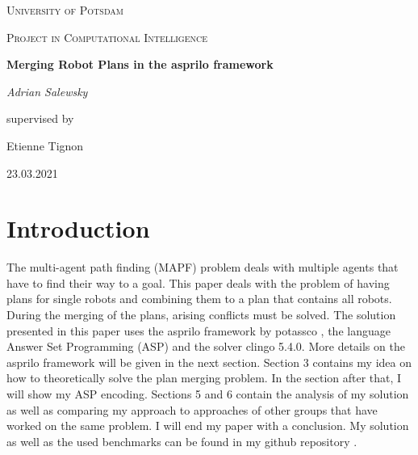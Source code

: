 \documentclass[runningheads]{llncs}
\begin{document}
\begin{titlepage}
\centering
{\scshape\LARGE University of Potsdam \par}
\vspace{1cm}
{\scshape\Large Project in Computational Intelligence\par}
\vspace{1.5cm}
{\huge\bfseries Merging Robot Plans in the asprilo framework\par}
\vspace{2cm}
{\Large\itshape Adrian Salewsky\par}
\vfill
supervised by\par
Etienne Tignon
\vfill
{23.03.2021 \par}


\begin{abstract}
This paper shows my approach to solving the plan merging problem in multi-agent path finding. This means that plans for single robots are combined to a plan for all robots. During the merging, all arising conflicts must be dealt with. This was done for a project
at the University of Potsdam in the course Computational Intelligence for the chair Computational Intelligence. The project was done in the asprilo framework with the programming language Answer Set Programming. 
\end{abstract}
\end{titlepage}


\section{Introduction}
The multi-agent path finding (MAPF) problem deals with multiple agents that have to find their way to a goal. This paper deals with the problem of having plans for single robots and combining them to a plan that contains all robots. During the merging of the plans, arising conflicts must be solved. The solution presented in this paper uses the asprilo framework by potassco \cite{asprilo}, the language Answer Set Programming (ASP) and the solver clingo 5.4.0. More details on the asprilo framework will be given in the next section. Section 3 contains my idea on how to theoretically solve the plan merging problem. In the section after that, I will show my ASP encoding. Sections 5 and 6 contain the analysis of my solution as well as comparing my approach to approaches of other groups that have worked on the same problem. I will end my paper with a conclusion. My solution as well as the used benchmarks can be found in my github repository \cite{owngithub}.
\end{document}
